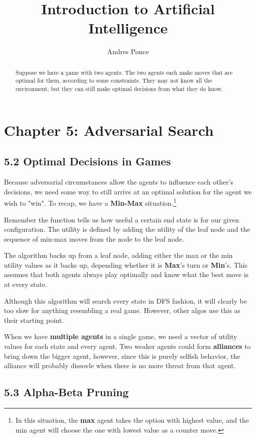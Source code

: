 \documentclass{tufte-handout}
\title{Introduction to Artificial Intelligence}
\author{Andres Ponce}
\begin{document}
\maketitle
\begin{abstract}
	Suppose we have a game with two agents. The two agents each
	make moves that are optimal for them, according to some constraints. 
	They may not know all the environment, but they can still make 
	optimal decisions from what they do know.
\end{abstract}
\section{Chapter 5: Adversarial Search}

\subsection{5.2 Optimal Decisions in Games}
	Because adversarial circumstances allow the agents to influence each 
	other's decisions, we need some way to still arrive at an optimal 
	solution for the agent we wish to "win". To recap, we have a 
	\textbf{Min-Max} situation.\footnote{In this situation, the \textbf{max}
	agent takes the option with highest value, and the min agent will choose
	the one with lowest value as a counter move.} 

	Remember the  function tells us how useful a certain 
	end state is for our given configuration. The utility is defined by adding
	the utility of the leaf node and the sequence of min-max moves from the node
	to the leaf node. 

	The  algorithm backs up from a leaf node, adding
	either the max or the min utility values as it backs up, depending whether
	it is \textbf{Max}'s turn or \textbf{Min}'s. This assumes that both agents 
	always play optimally and know what the best move is at every state. 
	
	Although this algorithm will search every state in DFS fashion, it will 
	clearly be too slow for anything resembling a real game. However, other algos 
	use this as their starting point. 
	
	When we have \textbf{multiple agents} in a single game, we need a vector of 
	utility values for each state and every agent. Two weaker agents could form 
	\textbf{alliances} to bring down the bigger agent, however, since this is purely 
	selfish behavior, the alliance will probably dissovle when there is no more threat 
	from that agent. 
	
\subsection{5.3 Alpha-Beta Pruning}
\end{document}

